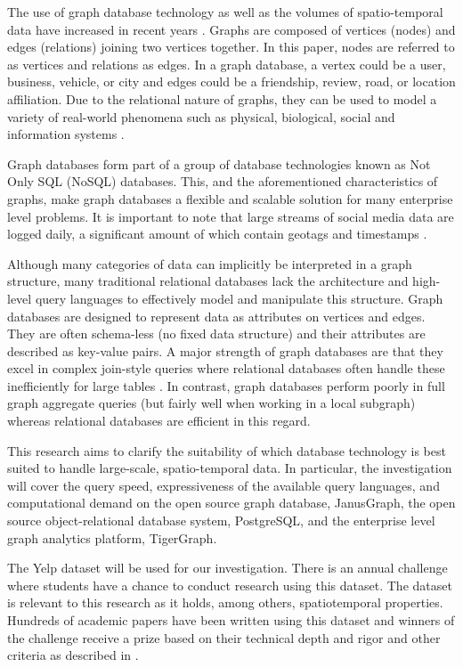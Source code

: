 The use of graph database technology as well as the volumes of spatio-temporal data have increased in recent years \cite{mongovspostgres}. Graphs are composed of vertices (nodes) and edges (relations) joining two vertices together. In this paper, nodes are referred to as vertices and relations as edges. In a graph database, a vertex could be a user, business, vehicle, or city and edges could be a friendship, review, road, or location affiliation. Due to the relational nature of graphs, they can be used to model a variety of real-world phenomena such as physical, biological, social and information systems \cite{socialdata}.

Graph databases form part of a group of database technologies known as Not Only SQL (NoSQL) databases. This, and the aforementioned characteristics of graphs, make graph databases a flexible and scalable solution for many enterprise level problems. It is important to note that large streams of social media data are logged daily, a significant amount of which contain geotags and timestamps \cite{twitterdata}.

Although many categories of data can implicitly be interpreted in a graph structure, many traditional relational databases lack the architecture and high-level query languages to effectively model and manipulate this structure. Graph databases are designed to represent data as attributes on vertices and edges. They are often schema-less (no fixed data structure) and their attributes are described as key-value pairs. A major strength of graph databases are that they excel in complex join-style queries where relational databases often handle these inefficiently for large tables \cite{data-in-nosql}. In contrast, graph databases perform poorly in full graph aggregate queries (but fairly well when working in a local subgraph) whereas relational databases are efficient in this regard.

This research aims to clarify the suitability of which database technology is best suited to handle large-scale, spatio-temporal data. In particular, the investigation will cover the query speed, expressiveness of the available query languages, and computational demand on the open source graph database, JanusGraph, the open source object-relational database system, PostgreSQL, and the enterprise level graph analytics platform, TigerGraph.

The Yelp dataset will be used for our investigation. There is an annual challenge where students have a chance to conduct research using this dataset. The dataset is relevant to this research as it holds, among others, spatiotemporal properties. Hundreds of academic papers have been written using this dataset and winners of the challenge receive a prize based on their technical depth and rigor and other criteria as described in \cite{yelpdataset}.

